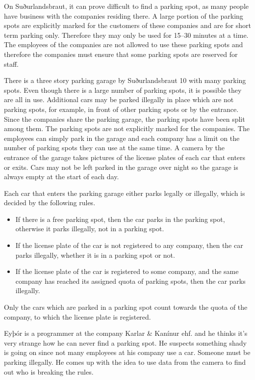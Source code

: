 
On Suðurlandsbraut, it can prove difficult to find a parking spot, as many people have business with the companies residing there.
A large portion of the parking spots are explicitly marked for the customers of these companies and are for short term parking only.
Therefore they may only be used for 15--30 minutes at a time.
The employees of the companies are not allowed to use these parking spots and therefore the companies must ensure that some parking spots are reserved for staff.

There is a three story parking garage by Suðurlandsbraut 10 with many parking spots.
Even though there is a large number of parking spots, it is possible they are all in use. Additional cars may be parked illegally in place which are not parking spots, for example, in front of other parking spots or by the entrance.
Since the companies share the parking garage, the parking spots have been split among them.
The parking spots are not explicitly marked for the companies. The employees can simply park in the garage and each company has a limit on the number of parking spots they can use at the same time.
A camera by the entrance of the garage takes pictures of the license plates of each car that enters or exits.
Cars may not be left parked in the garage over night so the garage is always empty at the start of each day.

Each car that enters the parking garage either parks legally or illegally, which is decided by the following rules.
\begin{itemize}
    \item If there is a free parking spot, then the car parks in the parking spot, otherwise it parks illegally, not in a parking spot.
    \item If the license plate of the car is not registered to any company, then the car parks illegally, whether it is in a parking spot or not.
    \item If the license plate of the car is registered to some company, and the same company has reached its assigned quota of parking spots, then the car parks illegally.
\end{itemize}
Only the cars which are parked in a parking spot count towards the quota of the company, to which the license plate is registered.

Eyþór is a programmer at the company Karlar \& Kanínur ehf. and he thinks it's very strange how he can never find a parking spot.
He suspects something shady is going on since not many employees at his company use a car.
Someone must be parking illegally.
He comes up with the idea to use data from the camera to find out who is breaking the rules.

